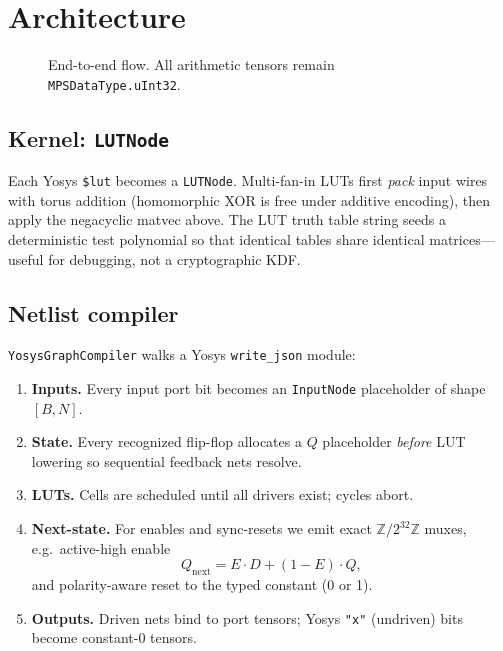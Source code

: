 \documentclass[11pt,a4paper]{article}
\begin{document}
\section{Architecture}
\label{sec:architecture}

\begin{figure}[t]
\centering
{}
\caption{End-to-end flow. All arithmetic tensors remain \texttt{MPSDataType.uInt32}.}
\label{fig:pipeline}
\end{figure}

\subsection{Kernel: \texttt{LUTNode}}

Each Yosys \texttt{\$lut} becomes a \texttt{LUTNode}.
Multi-fan-in LUTs first \emph{pack} input wires with torus addition (homomorphic
XOR is free under additive encoding), then apply the negacyclic matvec above.
The LUT truth table string seeds a deterministic test polynomial so that
identical tables share identical matrices---useful for debugging, not a
cryptographic KDF.

\subsection{Netlist compiler}

\texttt{YosysGraphCompiler} walks a Yosys \texttt{write\_json} module:

\begin{enumerate}[leftmargin=*,itemsep=1pt]
  \item \textbf{Inputs.} Every input port bit becomes an \texttt{InputNode}
        placeholder of shape $[B,N]$.
  \item \textbf{State.} Every recognized flip-flop allocates a $Q$ placeholder
        \emph{before} LUT lowering so sequential feedback nets resolve.
  \item \textbf{LUTs.} Cells are scheduled until all drivers exist; cycles abort.
  \item \textbf{Next-state.} For enables and sync-resets we emit exact
        $\mathbb{Z}/2^{32}\mathbb{Z}$ muxes, e.g.\ active-high enable
        \[
          Q_{\mathrm{next}}
          = E\cdot D + (1-E)\cdot Q,
        \]
        and polarity-aware reset to the typed constant (0 or 1).
  \item \textbf{Outputs.} Driven nets bind to port tensors; Yosys \texttt{"x"}
        (undriven) bits become constant-0 tensors.
\end{enumerate}
\end{document}
